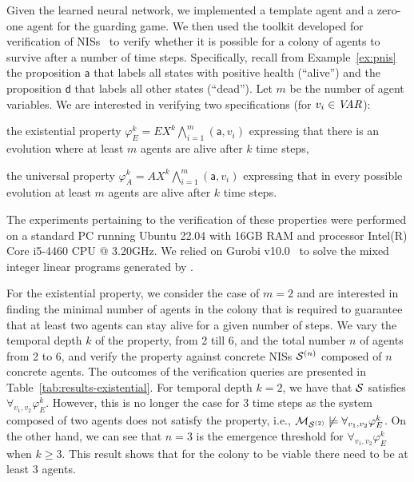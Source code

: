 Given the learned neural network, we implemented a template agent and a
zero-one agent for the guarding game. We then used the \venmas toolkit
developed for verification of NISs~\cite{Akintunde+20b} to verify whether it is
possible for a colony of agents to survive after a number of time steps.
%
Specifically, recall from Example~\ref{ex:pnis} the proposition $\mathsf{a}$
that labels all states with positive health (``alive'') and the proposition
$\mathsf{d}$ that labels all other states (``dead'').
%
Let $m$ be the number of agent variables. We are interested in verifying two
specifications (for $v_i \in\it{VAR}$):
\begin{inparaenum}[\it (i)]
\item the existential property
  $\varphi^k_E = EX^k \bigwedge_{i=1}^m(\mathsf{a},v_i)$ 
  expressing that there is an evolution where at least $m$ agents are alive after
  $k$ time steps,
\item the universal property $\varphi^k_A = AX^k \bigwedge_{i=1}^m(\mathsf{a},v_i)$
  expressing that in every possible evolution at least $m$ agents are alive
  after $k$ time steps.
\end{inparaenum}
%
The experiments pertaining to the verification of these properties were
performed on a standard PC running Ubuntu 22.04 with 16GB RAM and processor
Intel(R) Core i5-4460 CPU @ 3.20GHz. We relied on Gurobi v10.0~\cite{Gurobi+16a}
to solve the mixed integer linear programs generated by \venmas.

For the existential property, we consider the case of $m=2$ and are interested
in finding the minimal number of agents in the colony that is required to
guarantee that at least two agents can stay alive for a given number of
steps. We vary the temporal depth $k$ of the property, from 2 till 6, and the
total number $n$ of agents from 2 to 6, and verify the property against
concrete NISs $\mathcal{S}^{(n)}$ composed of $n$ concrete agents.  The outcomes of the
verification queries are presented in Table~\ref{tab:results-existential}.
%
For temporal depth $k=2$, we have that $\mathcal S$ satisfies
$\forall_{v_1,v_2}\varphi^k_E$. However, this is no longer the case for 3 time
steps as the system composed of two agents  does not satisfy the property,
i.e., $\mathcal{M}_{\mathcal{S}^{(2)}}\not\models\forall_{v_1,v_2}\varphi^k_E$. On the other hand, we
can see that $n=3$ is the emergence threshold for
$\forall_{v_1,v_2}\varphi^k_E$ when $k\geq 3$. This result shows that for the
colony to be viable there need to be at least 3 agents.


